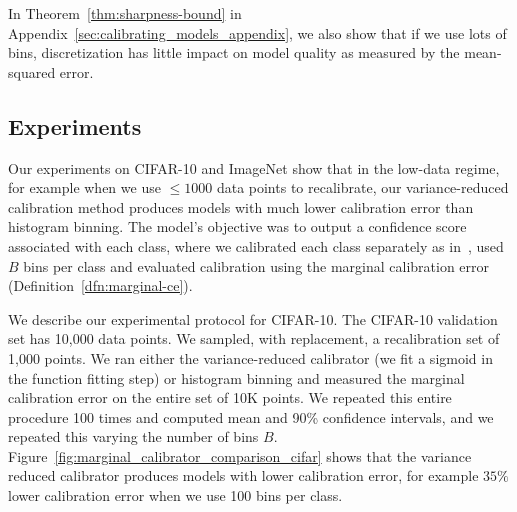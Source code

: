 In Theorem~\ref{thm:sharpness-bound} in Appendix~\ref{sec:calibrating_models_appendix}, we also show that if we use lots of  bins, discretization has little impact on model quality as measured by the mean-squared error.



\subsection{Experiments}

Our experiments on CIFAR-10 and ImageNet show that in the low-data regime, for example when we use $\leq 1000$ data points to recalibrate, our variance-reduced calibration method produces models with much lower calibration error than histogram binning. The model's objective was to output a confidence score associated with each class, where we calibrated each class separately as in~\cite{zadrozny2002transforming}, used $B$ bins per class and evaluated calibration using the marginal calibration error (Definition~\ref{dfn:marginal-ce}).

We describe our experimental protocol for CIFAR-10.
The CIFAR-10 validation set has 10,000 data points. We sampled, with replacement, a recalibration set of 1,000 points. We ran either the variance-reduced calibrator (we fit a sigmoid in the function fitting step) or histogram binning and measured the marginal calibration error on the entire set of 10K points.
We repeated this entire procedure 100 times and computed mean and 90\% confidence intervals, and we repeated this varying the number of bins $B$. Figure~\ref{fig:marginal_calibrator_comparison_cifar} shows that the variance reduced calibrator produces models with lower calibration error, for example $35\%$ lower calibration error when we use 100 bins per class.

